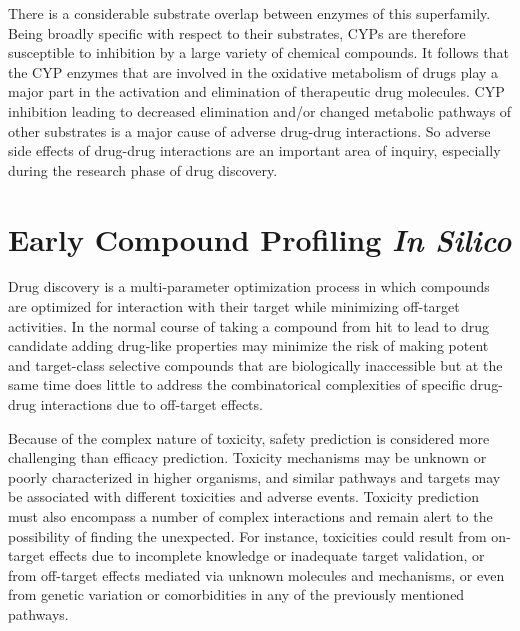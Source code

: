There is a considerable substrate overlap between enzymes of this superfamily. Being broadly specific with respect to their substrates, CYPs are therefore susceptible to inhibition by a large variety of chemical compounds. It follows that the CYP enzymes that are involved in the oxidative metabolism of drugs play a major part in the activation and elimination of therapeutic drug molecules. CYP inhibition leading to decreased elimination and/or changed metabolic pathways of other substrates is a major cause of adverse drug-drug interactions. \cite{Lapins2013} So adverse side effects of drug-drug interactions are an important area of inquiry, especially during the research phase of drug discovery.


\section{Early Compound Profiling \textit{In Silico}}

Drug discovery is a multi-parameter optimization process in which compounds are optimized for interaction with their target while minimizing off-target activities. \cite{Zlokarnik2005} In the normal course of taking a compound from hit to lead to drug candidate adding drug-like properties may minimize the risk of making potent and target-class selective compounds that are biologically inaccessible but at the same time does little to address the combinatorical complexities of specific drug-drug interactions due to off-target effects.


Because of the complex nature of toxicity, safety prediction is considered more challenging than efficacy prediction. Toxicity mechanisms may be unknown or poorly characterized in higher organisms, and similar pathways and targets may be associated with different toxicities and adverse events. Toxicity prediction must also encompass a number of complex interactions and remain alert to the possibility of finding the unexpected. For instance, toxicities could result from on-target effects due to incomplete knowledge or inadequate target validation, or from off-target effects mediated via unknown molecules and mechanisms, or even from genetic variation or comorbidities in any of the previously mentioned pathways. \cite{Kruhlak2012}


